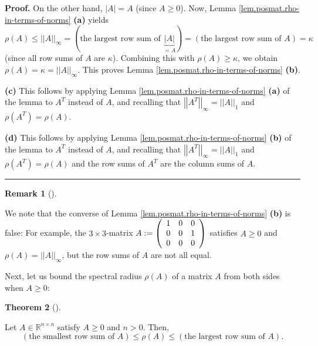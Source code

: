 \documentclass[numbers=enddot,12pt,final,onecolumn,notitlepage]{scrartcl}%
\numberwithin{exer}{subsection}
\theoremstyle{definition}
\newtheorem{theo}{Theorem}[subsection]
\newenvironment{theorem}[1][]
{\begin{theo}[#1]\begin{leftbar}}
{\end{leftbar}\end{theo}}
\newtheorem{remk}[theo]{Remark}
\newenvironment{remark}[1][]
{\begin{remk}[#1]\begin{leftbar}}
{\end{leftbar}\end{remk}}
\newenvironment{proof}[1][Proof]{\noindent\textbf{#1.} }{\ \rule{0.5em}{0.5em}}
\begin{document}
\begin{proof}
On the other hand, $\left\vert A\right\vert =A$ (since $A\geq0$). Now, Lemma
\ref{lem.posmat.rho-in-terms-of-norms} \textbf{(a)} yields
\[
\rho\left(  A\right)  \leq\left\vert \left\vert A\right\vert \right\vert
_{\infty}=\left(  \text{the largest row sum of }\underbrace{\left\vert
A\right\vert }_{=A}\right)  =\left(  \text{the largest row sum of }A\right)
=\kappa
\]
(since all row sums of $A$ are $\kappa$). Combining this with $\rho\left(
A\right)  \geq\kappa$, we obtain $\rho\left(  A\right)  =\kappa=\left\vert
\left\vert A\right\vert \right\vert _{\infty}$. This proves Lemma
\ref{lem.posmat.rho-in-terms-of-norms} \textbf{(b)}. \medskip

\textbf{(c)} This follows by applying Lemma
\ref{lem.posmat.rho-in-terms-of-norms} \textbf{(a)} of the lemma to $A^{T}$
instead of $A$, and recalling that $\left\vert \left\vert A^{T}\right\vert
\right\vert _{\infty}=\left\vert \left\vert A\right\vert \right\vert _{1}$ and
$\rho\left(  A^{T}\right)  =\rho\left(  A\right)  $. \medskip

\textbf{(d)} This follows by applying Lemma
\ref{lem.posmat.rho-in-terms-of-norms} \textbf{(b)} of the lemma to $A^{T}$
instead of $A$, and recalling that $\left\vert \left\vert A^{T}\right\vert
\right\vert _{\infty}=\left\vert \left\vert A\right\vert \right\vert _{1}$ and
$\rho\left(  A^{T}\right)  =\rho\left(  A\right)  $ and the row sums of
$A^{T}$ are the column sums of $A$.
\end{proof}

\begin{remark}
We note that the converse of Lemma \ref{lem.posmat.rho-in-terms-of-norms}
\textbf{(b)} is false: For example, the $3\times3$-matrix $A:=\left(
\begin{array}
[c]{ccc}%
1 & 0 & 0\\
0 & 0 & 1\\
0 & 0 & 0
\end{array}
\right)  $ satisfies $A\geq0$ and $\rho\left(  A\right)  =\left\vert
\left\vert A\right\vert \right\vert _{\infty}$, but the row sums of $A$ are
not all equal.
\end{remark}

Next, let us bound the spectral radius $\rho\left(  A\right)  $ of a matrix
$A$ from both sides when $A\geq0$:

\begin{theorem}
\label{thm.posmat.rho-in-terms-of-rowsums}Let $A\in\mathbb{R}^{n\times n}$
satisfy $A\geq0$ and $n>0$. Then,%
\[
\left(  \text{the smallest row sum of }A\right)  \leq\rho\left(  A\right)
\leq\left(  \text{the largest row sum of }A\right)  .
\]

\end{theorem}
\end{document}
